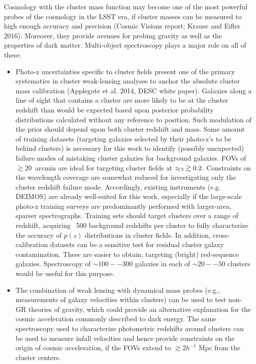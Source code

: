 Cosmology with the cluster mass function may become one of the most powerful probes of the cosmology in the LSST era, if cluster masses can be measured to high enough accuracy and precision (Cosmic Visions report; Krause and Eifler 2016).  Moreover, they provide avenues for probing gravity as well as the properties of dark matter.  Multi-object spectroscopy plays a major role on all of these:

\begin{itemize}
\item Photo-z uncertainties specific to cluster fields present one of the primary systematics in cluster weak-lensing analyses to anchor the absolute cluster mass calibration (Applegate et al. 2014, DESC white paper).  Galaxies along a line of sight that contains a cluster are more likely to be at the cluster redshift than would be expected based upon posterior probability distributions calculated without any reference to position.  Such modulation of the prior should depend upon both cluster redshift and mass.  Some amount of training datasets (targeting galaxies selected by their photo-z's to be behind clusters) is necessary for this work to identify (possibly unexpected) failure modes of mistaking cluster galaxies for background galaxies. FOVs of $\gtrsim 20$~arcmin are ideal for targeting cluster fields at $z_{\rm Cl}\gtrsim0.2$.  Constraints on the wavelength coverage are somewhat reduced for investigating only the cluster redshift failure mode. Accordingly, existing instruments (e.g. DEIMOS) are already well-suited for this work, especially if the large-scale photo-z training surveys are predominantly performed with larger-area, sparser spectrographs.  Training sets should target clusters over a range of redshift, acquiring ~500 background redshifts per cluster to fully characterize the accuracy of $p(z)$ distributions in cluster fields.  In addition, cross-calibration datasets can be a sensitive test for residual cluster galaxy contamination. These are easier to obtain, targeting (bright) red-sequence galaxies.  Spectroscopy of $\sim 100--300$ galaxies in each of $\sim 20--50$ clusters would be useful for this purpose.  
\item The combination of weak lensing with dynamical mass probes (e.g., measurements of galaxy velocities within clusters) can be used to test non-GR theories of gravity, which could provide an alternative explanation for the cosmic acceleration commonly described to dark energy. The same spectroscopy used to characterize photometric redshifts around clusters can be used to measure infall velocities and hence provide constraints on the origin of cosmic acceleration, if the FOVs extend to $\gtrsim 2h^{-1}$ Mpc from the cluster centers.

\end{itemize}
